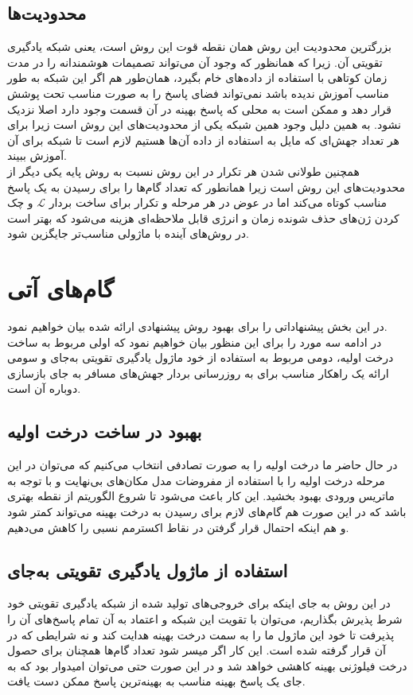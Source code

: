  \subsection{محدودیت‌ها}
  بزرگترین محدودیت این روش همان نقطه قوت این روش است، یعنی شبکه یادگیری تقویتی آن. زیرا که همانظور که وجود آن می‌تواند تصمیمات هوشمندانه را در مدت زمان کوتاهی با استفاده از داد‌ه‌های خام بگیرد، همان‌طور هم اگر این شبکه به طور مناسب آموزش ندیده باشد نمی‌تواند فضای پاسخ را به صورت مناسب تحت پوشش قرار دهد و ممکن است به محلی که پاسخ بهینه در آن قسمت وجود دارد اصلا نزدیک نشود. به همین دلیل وجود همین شبکه یکی از محدودیت‌های این روش است زیرا برای هر تعداد جهش‌ای که مایل به استفاده از داده آن‌ها هستیم لازم است تا شبکه برای آن آموزش ببیند.
  \\
  همچنین طولانی شدن هر تکرار در این روش نسبت به روش پایه یکی دیگر از محدودیت‌های این روش است زیرا همانطور که تعداد گام‌ها را برای رسیدن به یک پاسخ مناسب کوتاه می‌کند اما در عوض در هر مرحله و تکرار برای ساخت بردار $\mathcal{L}$ و چک کردن ژن‌های حذف شونده زمان و انرژی قابل ملاحظه‌ای هزینه می‌شود که بهتر است در روش‌های آینده با ماژولی مناسب‌تر جایگزین شود.
  
  
\section{گام‌های آتی}
در این بخش پیشنهاداتی را برای بهبود روش پیشنهادی ارائه شده بیان خواهیم نمود.\\
در ادامه سه مورد را برای این منظور بیان خواهیم نمود که اولی مربوط به ساخت درخت اولیه، دومی مربوط به استفاده از خود ماژول یادگیری تقویتی به‌جای  و سومی ارائه یک راهکار مناسب برای به روزرسانی بردار جهش‌های مسافر به جای بازسازی دوباره آن است.


\subsection{بهبود در ساخت درخت اولیه}
در حال حاضر ما درخت اولیه را به صورت تصادفی انتخاب می‌کنیم که می‌توان در این مرحله درخت اولیه را با استفاده از مفروضات مدل مکان‌های بی‌نهایت و با توجه به ماتریس ورودی بهبود بخشید. این کار باعث می‌شود تا شروع الگوریتم از نقطه بهتری باشد که در این صورت هم گام‌های لازم برای رسیدن به درخت بهینه می‌تواند کمتر شود و هم اینکه احتمال قرار گرفتن در نقاط اکسترمم نسبی را کاهش می‌دهیم.


\subsection{استفاده از ماژول یادگیری تقویتی به‌جای  }
در این روش به جای اینکه برای خروجی‌های تولید شده از شبکه یادگیری تقویتی خود شرط پذیرش بگذاریم، می‌توان با تقویت این شبکه و اعتماد به آن تمام پاسخ‌های آن را پذیرفت تا خود این ماژول ما را به سمت درخت بهینه هدایت کند و نه شرایطی که در آن قرار گرفته شده است. این کار اگر میسر شود تعداد گام‌ها همچنان برای حصول درخت فیلوژنی بهینه کاهشی خواهد شد و در این صورت حتی می‌توان امیدوار بود که به جای یک پاسخ بهینه مناسب به بهینه‌ترین پاسخ ممکن دست یافت.

